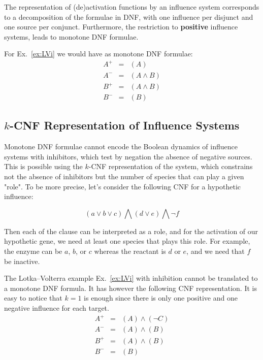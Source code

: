 \documentclass{llncs}
\begin{document}
The representation of (de)activation functions by an influence system 
corresponds to a decomposition of the formulae in DNF, 
with one influence per disjunct and one source per conjunct.
Furthermore, the restriction to \textbf{positive} influence systems, leads to monotone DNF formulae.

\begin{example}

For Ex.~\ref{ex:LVi} we would have as monotone DNF formulae:
\begin{eqnarray*}
   A^+&=&(A)\\
   A^-&=&(A \wedge B)\\
   B^+&=&(A\wedge B)\\
   B^-&=&(B)
\end{eqnarray*}

\end{example}


\subsection{$k$-CNF Representation of Influence Systems}

Monotone DNF formulae cannot encode the Boolean dynamics of influence systems with inhibitors, which test by negation the absence of negative sources.
This is possible using the $k$-CNF representation of the system, which constrains not the absence of inhibitors but the number of species that can play a given "role". To be more precise, let's consider the following CNF for a hypothetic influence:

\[
\left(a \vee b \vee c\right) \bigwedge
\left(d \vee e\right) \bigwedge 
\neg f
\]

Then each of the clause can be interpreted as a role, and for the activation of our hypothetic gene, we need at least one species that plays this role. For example, the enzyme can be $a$, $b$, or $c$ whereas 
the reactant is $d$ or $e$, and we need that $f$ be inactive.


\begin{example}
   The Lotka--Volterra example Ex.~\ref{ex:LVi} with inhibition cannot be
   translated to a monotone DNF formula. It has however the following CNF
   representation. It is easy to
   notice that $k=1$ is enough since there is only one positive and one
   negative influence for each target.
\begin{eqnarray*}
   A^+&=&(A)\wedge(\neg C)\\
A^-&=&(A) \wedge (B)\\
B^+&=&(A)\wedge (B)\\
   B^-&=&(B)
\end{eqnarray*}

\end{example}
\end{document}
